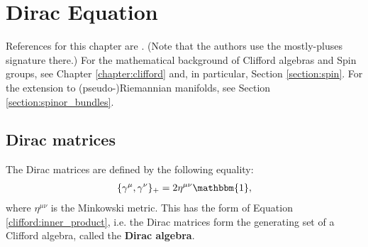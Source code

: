 \chapter{Dirac Equation}\label{chapter:dirac}

    References for this chapter are \cite{supergravity}. (Note that the authors use the mostly-pluses signature there.) For the mathematical background of Clifford algebras and Spin groups, see Chapter \ref{chapter:clifford} and, in particular, Section \ref{section:spin}. For the extension to (pseudo-)Riemannian manifolds, see Section \ref{section:spinor_bundles}.

\section{Dirac matrices}

    \begin{property}
        The Dirac matrices are defined by the following equality:
        \begin{gather}
            \label{dirac:clifford_relation}
            \{\gamma^\mu,\gamma^\nu\}_+ = 2\eta^{\mu\nu}\mathbbm{1},
        \end{gather}
        where $\eta^{\mu\nu}$ is the Minkowski metric. This has the form of Equation \eqref{clifford:inner_product}, i.e. the Dirac matrices form the generating set of a Clifford algebra, called the \textbf{Dirac algebra}.
    \end{property}

